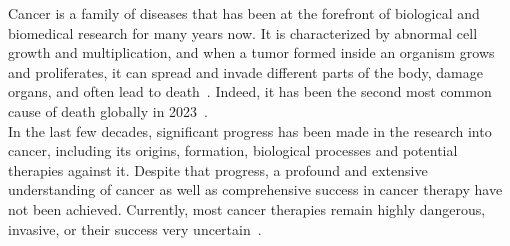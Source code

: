 
Cancer is a family of diseases that has been at the forefront of biological and biomedical research for many years now.
It is characterized by abnormal cell growth and multiplication, and when a tumor formed inside an organism grows and proliferates, it can spread and invade different parts of the body, damage organs, and often lead to death~\cite{who-cancer}.
Indeed, it has been the second most common cause of death globally in 2023~\cite{owid-causes-of-death}.\\
In the last few decades, significant progress has been made in the research into cancer, including its origins, formation, biological processes and potential therapies against it.
Despite that progress, a profound and extensive understanding of cancer as well as comprehensive success in cancer therapy have not been achieved.
Currently, most cancer therapies remain highly dangerous, invasive, or their success very uncertain~\cite{side-effects-cancer-treatments, narrative-review-heterogeneity-challenges}.

